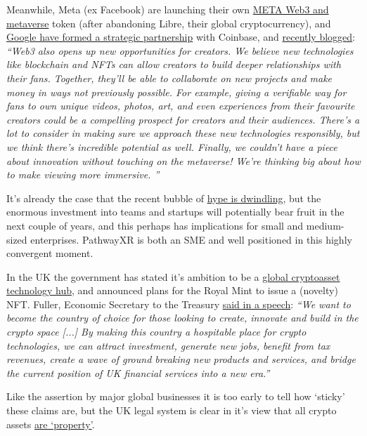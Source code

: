 \documentclass[
	10pt, %
	fleqn, %
	a5paper, %
]{LegrandOrangeBook}
\begin{document}
Meanwhile, Meta (ex Facebook) are launching their own \href{https://archive.ph/coyp2}{META Web3 and metaverse} token (after abandoning Libre, their global cryptocurrency), and \href{https://www.coinbase.com/blog/announcing-coinbase-google-cloud}{Google have formed a strategic partnership} with Coinbase, and \href{https://blog.youtube/inside-youtube/innovations-for-2022-at-youtube/}{recently blogged}: \textit{``Web3 also opens up new opportunities for creators. We believe new technologies like blockchain and NFTs can allow creators to build deeper relationships with their fans. Together, they'll be able to collaborate on new projects and make money in ways not previously possible. For example, giving a verifiable way for fans to own unique videos, photos, art, and even experiences from their favourite creators could be a compelling prospect for creators and their audiences. There's a lot to consider in making sure we approach these new technologies responsibly, but we think there's incredible potential as well. Finally, we couldn't have a piece about innovation without touching on the metaverse! We're thinking big about how to make viewing more immersive. ''}\par
It's already the case that the recent bubble of \href{https://www.forbes.com/sites/paultassi/2022/03/10/interest-in-nfts-and-the-metaverse-is-falling-fast/?}{hype is dwindling}, but the enormous investment into teams and startups will potentially bear fruit in the next couple of years, and this perhaps has implications for small and medium-sized enterprises. PathwayXR is both an SME and well positioned in this highly convergent moment.\par
In the UK the government has stated it's ambition to be a \href{https://www.gov.uk/government/news/government-sets-out-plan-to-make-uk-a-global-cryptoasset-technology-hub}{global cryptoasset technology hub}, and announced plans for the Royal Mint to issue a (novelty) NFT. Fuller, Economic Secretary to the Treasury \href{https://drive.google.com/file/d/19ZYKLeT-ds3TueTpqSM22MUqB4gmN_Pl/view}{said in a speech}: \textit{``We want to become the country of choice for those looking to create, innovate and build in the crypto space [...] By making this country a hospitable place for crypto technologies, we can attract investment, generate new jobs, benefit from tax revenues, create a wave of ground breaking new products and services, and bridge the current position of UK financial services into a new era.''}\par
Like the assertion by major global businesses it is too early to tell how `sticky' these claims are, but the UK legal system is clear in it's view that all crypto assets \href{https://blockchain.bakermckenzie.com/2020/02/03/uk-court-confirms-bitcoins-status-as-property/}{are `property'}.\par
\end{document}
